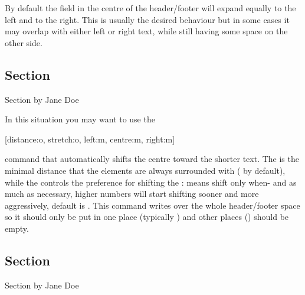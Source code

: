 By default the field in the centre of the header\slash{}footer will expand equally
to the left and to the right. This is usually the desired behaviour but in some
cases it may overlap with either left or right text, while still having some
space on the other side.
\begin{example}[standalone, paperheight=3cm]
\geometry{includehead, includefoot, headsep=.5em, footskip=1em} %
\sloppy %
\usepackage{fancyhdr}%
\usepackage{extramarks}%
\pagestyle{fancy}%
\fancyhead[L]{\thepage}
\fancyhead[C]{\firstleftmark}

\section{Section}
Section by Jane Doe
\end{example}
In this situation you may want to use the
\begin{lscommand}
  [distance:o, stretch:o, left:m, centre:m, right:m]
\end{lscommand}
command that automatically shifts the centre toward the shorter text. The
 is the minimal distance that the elements are always surrounded
with (\cargv{1em} by default), while the  controls the preference
for shifting the :  means shift only when- and as much
as necessary, higher numbers will start shifting sooner and more aggressively,
default is . This command writes over the whole header\slash{}footer
space so it should only be put in one place (typically ) and other
places () should be empty.
\begin{example}[standalone, paperheight=3cm]
\geometry{includehead, includefoot, headsep=.5em, footskip=1em} %
\sloppy %
\usepackage{fancyhdr}%
\usepackage{extramarks}%
\pagestyle{fancy}%
\fancyhead[L,R]{}

\section{Section}
Section by Jane Doe
\end{example}

